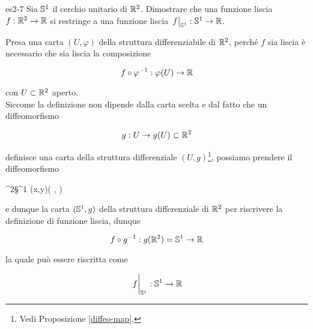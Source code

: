 
{es2-7}
{
Sia $ \S^{1} $ il cerchio unitario di $ \R^{2} $. Dimostrare che una funzione liscia $ f : \R^{2} \to \R $ si restringe a una funzione liscia $ \eval{f}_{\S^{1}} : \S^{1} \to \R $.
}
{
Presa una carta $ (U,\varphi) $ della struttura differenziabile di $ \R^{2} $, perché $ f $ sia liscia è necessario che sia liscia la composizione

\begin{equation}
	f \circ \varphi^{-1} : \varphi(U) \to \R
\end{equation}

con $ U \subset \R^{2} $ aperto. \\
Siccome la definizione non dipende dalla carta scelta e dal fatto che un diffeomorfismo

\begin{equation}
	g : U \to g(U) \subset \R^{2}
\end{equation}

definisce una carta della struttura differenziale $ (U,g) $\footnote{%
	Vedi Proposizione \ref{diffeo-map}.%
}, possiamo prendere il diffeomorfismo

	{\R^{2}}{\S^{1}}
	{(x,y)}{\left( , \right)}

e dunque la carta $ (\S^{1},g) $ della struttura differenziale di $ \R^{2} $ per riscrivere la definizione di funzione liscia, dunque

\begin{equation}
	f \circ g^{-1} : g(\R^{2}) = \S^{1} \to \R
\end{equation}

la quale può essere riscritta come

\begin{equation}
	\eval{f}_{\S^{1}} : \S^{1} \to \R
\end{equation}
}


